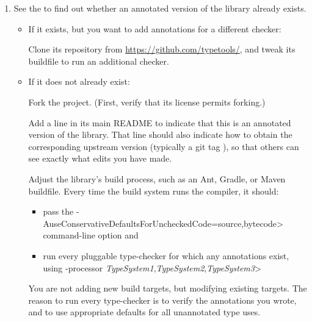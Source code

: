 \begin{enumerate}
\item See the
  to find out whether an annotated version of the library already exists.

  \begin{itemize}
  \item
    If it exists, but you want to add annotations for a different checker:

    Clone its repository from \url{https://github.com/typetools/}, and tweak
    its buildfile to run an additional checker.

  \item
    If it does not already exist:

    Fork the project.  (First, verify that its license permits forking.)

    Add a line in its main README to indicate that this is an annotated
    version of the library.  That line should also indicate how to obtain
    the corresponding upstream version (typically a git tag
    ), so that others can see exactly what edits you have
    made.

  Adjust the library's
  build process, such as an Ant, Gradle, or Maven buildfile.
    Every time the build system runs the compiler, it should:
    \begin{itemize}
    \item
      pass the \<-AuseConservativeDefaultsForUncheckedCode=source,bytecode>
      command-line option and
    \item
      run every pluggable type-checker for which any
      annotations exist, using \<-processor
      \emph{TypeSystem1},\emph{TypeSystem2},\emph{TypeSystem3}>
    \end{itemize}

  You are not adding new build targets, but modifying existing targets.
  The reason to run every type-checker is to verify
  the annotations you wrote, and to use appropriate defaults for all
  unannotated type uses.
  \end{itemize}


\end{enumerate}
